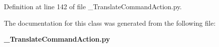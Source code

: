 \subsubsection[{action\-\_\-result}]{}\label{classoryx__drive__controller_1_1msg_1_1__TranslateCommandAction_1_1TranslateCommandAction_a3319589d67ad5eca6d47348ffc1df276}


\-Definition at line 142 of file \-\_\-\-Translate\-Command\-Action.\-py.



\-The documentation for this class was generated from the following file\-:\begin{DoxyCompactItemize}
\item 
{\bf \-\_\-\-Translate\-Command\-Action.\-py}\end{DoxyCompactItemize}
